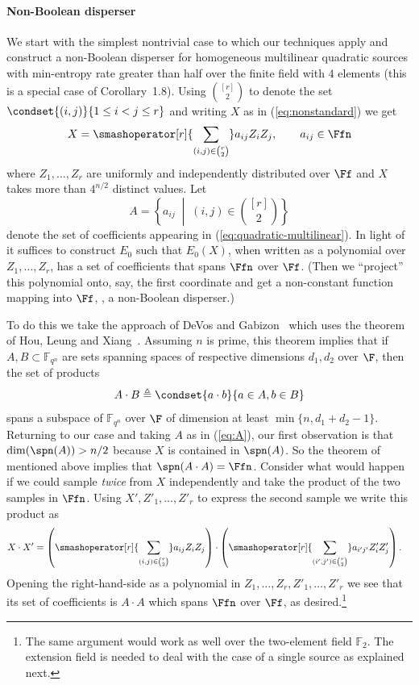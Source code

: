 \paragraph{Non-Boolean disperser} We start with the simplest nontrivial case to which our techniques apply and construct a non-Boolean disperser for homogeneous multilinear quadratic sources with min-entropy rate greater than half over the finite field with $4$ elements (this is a special case of Corollary~1.8).
Using
%
%
$\binom{[r]}{2}$
to denote the set $\condset{(i,j)}{1\leq i< j\leq r}$ and writing $X$ as in (\ref{eq:nonstandard}) we get
\begin{equation}
  \label{eq:quadratic-multilinear}
  X=\smashoperator[r]{\sum_{(i,j) \in\binom{r}{2}}} a_{ij} Z_i Z_j, \qquad a_{ij} \in \Ffn
\end{equation}
where $Z_1,\ldots,Z_r$ are uniformly and independently distributed over 
$\Ff$ and $X$ 
%
%
takes more than $4^{n/2}$ distinct values.
Let \begin{equation}
  \label{eq:A}
  A=\left\{ a_{ij} \;\middle|\; (i,j) \in \binom{[r]}{2}\right\}
\end{equation}
denote the set of coefficients appearing in (\ref{eq:quadratic-multilinear}). In light of  it suffices to construct $E_0$ such that $E_0(X)$,
 when written as a polynomial over $Z_1,\ldots, Z_r$, has a set of coefficients that spans $\Ffn$ over $\Ff$. (Then we ``project'' this polynomial onto, say, the first coordinate and get a non-constant function mapping into $\Ff$, \ie, a non-Boolean disperser.)

To do this we take the approach of DeVos and Gabizon~\cite{DG10} which uses the theorem of Hou, Leung and Xiang~\cite{HLX02}.
 Assuming $n$ is prime, this theorem implies that if $A,B\subset \mathbb{F}_{q^n}$ are sets spanning spaces of respective dimensions $d_1,d_2$ over $\F$,
 then the set of products \[A\cdot B\triangleq \condset{a\cdot b}{a\in A, b\in B}\] spans a subspace of $\mathbb{F}_{q^n}$ over $\F$ of dimension at least $\min\{n, d_1+d_2-1 \}$. Returning to our case and taking $A$ as in (\ref{eq:A}), our first observation is that $\dim(\spn(A))>n/2$ because $X$ is contained in $\spn(A)$. So the theorem of~\cite{HLX02} mentioned above implies that $\spn(A\cdot A)=\Ffn$.
Consider what would happen if we could sample \emph{twice} from $X$ independently and take the product of the two samples in $\Ffn$. Using $X',Z'_1,\ldots,Z'_r$ to express the second sample we write this product as
\begin{align*}
  X\cdot X' &=  \left(\smashoperator[r]{\sum_{(i,j) \in\binom{r}{2}}} a_{ij} Z_i Z_j \right)\cdot \left(\smashoperator[r]{\sum_{(i',j') \in\binom{r}{2}}} a_{i'j'} Z'_i Z'_j \right).
\end{align*}
Opening the right-hand-side as a polynomial in $Z_1,\ldots,Z_r,Z'_1,\ldots,Z'_r$ we see that its set of coefficients is $A\cdot A$ which spans $\Ffn$ over $\Ff$, as desired.\footnote{The same argument would work as well over the two-element field $\mathbb{F}_2$. The extension field is needed to deal with the case of a single source as explained next.}


